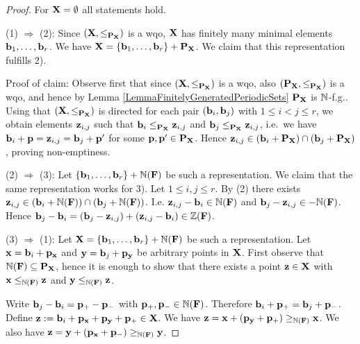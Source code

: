 \begin{proof}
For \(\mathbf{X}=\emptyset\) all statements hold.

(1) \(\Rightarrow\) (2): Since \((\mathbf{X}, \leq_{\operatorname{\mathbf{P}_{\mathbf{X}}}})\) is a wqo, \(\mathbf{X}\) has finitely many minimal elements \(\mathbf{b}_1, \dots, \mathbf{b}_r\). We have \(\mathbf{X}=\{\mathbf{b}_1, \dots, \mathbf{b}_r\}+\operatorname{\mathbf{P}_{\mathbf{X}}}\). We claim that this representation fulfills 2).

Proof of claim: Observe first that since \((\mathbf{X}, \leq_{\operatorname{\mathbf{P}_{\mathbf{X}}}})\) is a wqo, also \((\operatorname{\mathbf{P}_{\mathbf{X}}}, \leq_{\operatorname{\mathbf{P}_{\mathbf{X}}}})\) is a wqo, and hence by Lemma \ref{LemmaFinitelyGeneratedPeriodicSets} \(\operatorname{\mathbf{P}_{\mathbf{X}}}\) is \(\mathbb{N}\)-f.g.. Using that \((\mathbf{X}, \leq_{\operatorname{\mathbf{P}_{\mathbf{X}}}})\) is directed for each pair \((\mathbf{b}_i, \mathbf{b}_j)\) with \(1 \leq i < j \leq r\), we obtain elements \(\mathbf{z}_{i,j}\) such that \(\mathbf{b}_i \leq_{\operatorname{\mathbf{P}_{\mathbf{X}}}} \mathbf{z}_{i,j}\) and \(\mathbf{b}_j \leq_{\operatorname{\mathbf{P}_{\mathbf{X}}}} \mathbf{z}_{i,j}\), i.e.\ we have \(\mathbf{b}_i+\mathbf{p}=\mathbf{z}_{i,j}=\mathbf{b}_j+\mathbf{p}'\) for some \(\mathbf{p}, \mathbf{p}' \in \operatorname{\mathbf{P}_{\mathbf{X}}}\). Hence \(\mathbf{z}_{i,j} \in (\mathbf{b}_i + \operatorname{\mathbf{P}_{\mathbf{X}}}) \cap (\mathbf{b}_j + \operatorname{\mathbf{P}_{\mathbf{X}}})\), proving non-emptiness.

(2) \(\Rightarrow\) (3): Let \(\{\mathbf{b}_1, \dots, \mathbf{b}_r\}+\mathbb{N}(\mathbf{F})\) be such a representation. We claim that the same representation works for 3). Let \(1 \leq i,j \leq r\). By (2) there exists \(\mathbf{z}_{i,j} \in (\mathbf{b}_i + \mathbb{N}(\mathbf{F})) \cap (\mathbf{b}_j+\mathbb{N}(\mathbf{F}))\). I.e. \(\mathbf{z}_{i,j}-\mathbf{b}_i \in \mathbb{N}(\mathbf{F})\) and \(\mathbf{b}_j - \mathbf{z}_{i,j} \in - \mathbb{N}(\mathbf{F})\). Hence \(\mathbf{b}_j - \mathbf{b}_i=(\mathbf{b}_j - \mathbf{z}_{i,j})+(\mathbf{z}_{i,j}-\mathbf{b}_i) \in \mathbb{Z}(\mathbf{F})\).

(3) \(\Rightarrow\) (1): Let \(\mathbf{X}=\{\mathbf{b}_1, \dots, \mathbf{b}_r\}+\mathbb{N}(\mathbf{F})\) be such a representation. Let \(\mathbf{x}=\mathbf{b}_i+\mathbf{p}_{\mathbf{x}}\) and \(\mathbf{y}=\mathbf{b}_j+\mathbf{p}_{\mathbf{y}}\) be arbitrary points in \(\mathbf{X}\). First observe that \(\mathbb{N}(\mathbf{F}) \subseteq \operatorname{\mathbf{P}_{\mathbf{X}}}\), hence it is enough to show that there exists a point \(\mathbf{z} \in \mathbf{X}\) with \(\mathbf{x} \leq_{\mathbb{N}(\mathbf{F})} \mathbf{z}\) and \(\mathbf{y} \leq_{\mathbb{N}(\mathbf{F})} \mathbf{z}\). 

Write \(\mathbf{b}_j - \mathbf{b}_i=\mathbf{p}_+ - \mathbf{p}_-\) with \(\mathbf{p}_+, \mathbf{p}_- \in \mathbb{N}(\mathbf{F})\).
Therefore \(\mathbf{b}_i+\mathbf{p}_+ = \mathbf{b}_j+\mathbf{p}_-\).
Define \(\mathbf{z}:=\mathbf{b}_i+\mathbf{p}_{\mathbf{x}}+\mathbf{p}_{\mathbf{y}} +\mathbf{p}_+ \in \mathbf{X}\). We have \(\mathbf{z}=\mathbf{x}+(\mathbf{p}_{\mathbf{y}} + \mathbf{p}_+) \geq_{\mathbb{N}(\mathbf{F})} \mathbf{x}\). We also have \(\mathbf{z}=\mathbf{y}+(\mathbf{p}_{\mathbf{x}}+\mathbf{p}_-) \geq_{\mathbb{N}(\mathbf{F})} \mathbf{y}\).
\end{proof}

